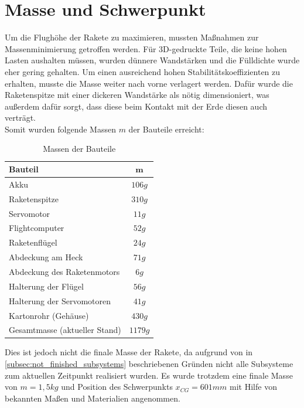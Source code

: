 \section{Masse und Schwerpunkt}
\label{sec:mass_and_cg}
Um die Flughöhe der Rakete zu maximieren, mussten Maßnahmen zur Massenminimierung getroffen werden. Für 3D-gedruckte Teile, die keine hohen Lasten aushalten müssen, wurden dünnere Wandstärken und die Fülldichte wurde eher gering gehalten. Um einen ausreichend hohen Stabilitätskoeffizienten zu erhalten, musste die Masse weiter nach vorne verlagert werden. Dafür wurde die Raketenspitze mit einer dickeren Wandstärke als nötig dimensioniert, was außerdem dafür sorgt, dass diese beim Kontakt mit der Erde diesen auch verträgt.
\\
Somit wurden folgende Massen $m$ der Bauteile erreicht:
\begin{table}[H]
    \centering
    \begin{tabular}{|l|c|}
        \hline
        \textbf{Bauteil} & $\mathbf{m}$ \\
        \hline
        Akku & $106g$ \\
        Raketenspitze & $310g$ \\
        Servomotor & $11g$ \\
        Flightcomputer & $52g$ \\
        Raketenflügel & $24g$ \\
        Abdeckung am Heck & $71g$ \\
        Abdeckung des Raketenmotors & $6g$ \\
        Halterung der Flügel & $56g$ \\
        Halterung der Servomotoren & $41g$ \\
        Kartonrohr (Gehäuse) & $430g$ \\
        Gesamtmasse (aktueller Stand) & $1179g$ \\
        \hline
    \end{tabular}    
    \caption{Massen der Bauteile}
    \label{tab:parts_mass}
\end{table}
Dies ist jedoch nicht die finale Masse der Rakete, da aufgrund von in \ref{subsec:not_finished_subsystems} beschriebenen Gründen nicht alle Subsysteme zum aktuellen Zeitpunkt realisiert wurden. Es wurde trotzdem eine finale Masse von $m = 1,5kg$ und Position des Schwerpunkts $x_{CG} = 601mm$ mit Hilfe von bekannten Maßen und Materialien angenommen. 

